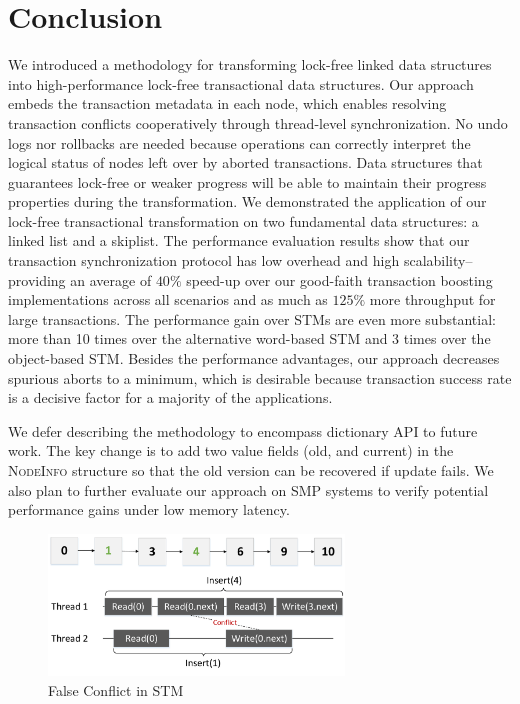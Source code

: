 \documentclass[]{sig-alternate-05-2015}
\begin{document}
\section{Conclusion}
\label{sec:conclusion}
We introduced a methodology for transforming lock-free linked data structures into high-performance lock-free transactional data structures. 
Our approach embeds the transaction metadata in each node, which enables resolving transaction conflicts cooperatively through thread-level synchronization.
No undo logs nor rollbacks are needed because operations can correctly interpret the logical status of nodes left over by aborted transactions.
Data structures that guarantees lock-free or weaker progress will be able to maintain their progress properties during the transformation.
We demonstrated the application of our lock-free transactional transformation on two fundamental data structures: a linked list and a skiplist.  
The performance evaluation results show that our transaction synchronization protocol has low overhead and high scalability--providing an average of $40\%$ speed-up over our good-faith transaction boosting implementations across all scenarios and as much as $125\%$ more throughput for large transactions.
The performance gain over STMs are even more substantial: more than 10 times over the alternative word-based STM and 3 times over the object-based STM.
Besides the performance advantages, our approach decreases spurious aborts to a minimum, which is desirable because transaction success rate is a decisive factor for a majority of the applications.

We defer describing the methodology to encompass dictionary API to future work.
The key change is to add two value fields (old, and current) in the \textsc{NodeInfo} structure so that the old version can be recovered if update fails.
We also plan to further evaluate our approach on SMP systems to verify potential performance gains under low memory latency.

\begin{figure}[p]
    \centering
    \includegraphics[width=0.7\textwidth]{figure/stmconflict.pdf}
    \caption{False Conflict in STM}
    \label{fig:stmconflict}
\end{figure}
\end{document}
